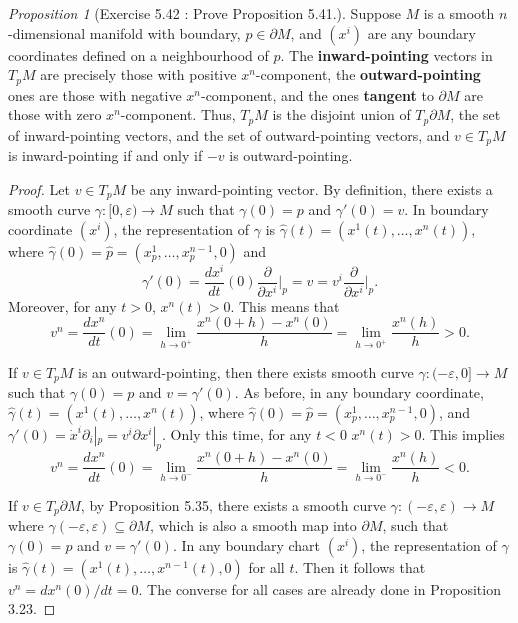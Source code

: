 \documentclass[a4paper]{article}
\theoremstyle{remark}
\newtheorem{prop}{Proposition}
\newcommand{\doo}{\partial}    %
\newcommand{\subhim}{\subseteq} %
\begin{document}
\begin{prop}[Exercise 5.42  : Prove Proposition 5.41.]
Suppose $M$ is a smooth $n$-dimensional manifold with boundary, $p \in \doo M$, and $(x^i)$ are any boundary coordinates defined on a neighbourhood of $p$. The \textbf{inward-pointing} vectors in $T_pM$ are precisely those with positive $x^n$-component, the \textbf{outward-pointing} ones are those with negative $x^n$-component, and the ones \textbf{tangent} to $\doo M$ are those with zero $x^n$-component. Thus, $T_pM$ is the disjoint union of $T_p\doo M$, the set of inward-pointing vectors, and the set of outward-pointing vectors, and $v \in T_pM$ is inward-pointing if and only if $-v$ is outward-pointing.
\end{prop}
\begin{proof}
Let $v \in T_pM$ be any inward-pointing vector. By definition, there exists a smooth curve $\gamma :[0,\varepsilon) \to M$ such that $\gamma(0)=p$ and $\gamma'(0) = v$. In boundary coordinate $(x^i)$, the representation of $\gamma$ is $\widehat{\gamma}(t) = (x^1(t),\dots,x^n(t))$, where $\widehat{\gamma}(0) = \widehat{p} = (x^1_p,\dots,x^{n-1}_p,0)$ and 
$$
\gamma'(0) = \frac{dx^i}{dt}(0) \frac{\doo}{\doo x^i}\bigg|_p=v = v^i\frac{\doo}{\doo x^i}\bigg|_p.
$$ 
Moreover, for any $t>0$, $x^n(t) > 0$. This means that
$$
v^n = \frac{dx^n}{dt}(0) = \lim_{h \to 0^+} \frac{x^n(0+h) - x^n(0)}{h} = \lim_{h\to 0^+} \frac{x^n(h)}{h} > 0 .
$$

If $v \in T_pM$ is an outward-pointing, then there exists smooth curve $\gamma : (-\varepsilon,0] \to M$ such that $\gamma(0) = p$ and $v = \gamma'(0)$. As before, in any boundary coordinate, $\widehat{\gamma}(t) = (x^1(t),\dots,x^n(t))$, where $\widehat{\gamma}(0) = \widehat{p} = (x^1_p,\dots,x^{n-1}_p,0)$, and $\gamma'(0) = \dot{x}^i \doo_i|_p = v^i \doo x^i|_p$. Only this time, for any $t<0$ $x^n(t)>0$. This implies
$$
v^n = \frac{dx^n}{dt}(0) = \lim_{h \to 0^-} \frac{x^n(0+h) - x^n(0)}{h} = \lim_{h \to 0^-} \frac{x^n(h)}{h} < 0.
$$

If $v \in T_p\doo M$, by Proposition 5.35, there exists a smooth curve $\gamma : (-\varepsilon,\varepsilon) \to M$ where $\gamma(-\varepsilon,\varepsilon) \subhim \doo M$, which is also a smooth map into $\doo M$, such that $\gamma(0) = p$ and $v = \gamma'(0)$. In any boundary chart $(x^i)$, the representation of $\gamma$ is $\widehat{\gamma}(t) = (x^1(t),\dots,x^{n-1}(t),0)$ for all $t$. Then it follows that $v^n =dx^n(0)/dt = 0$. The converse for all cases are already done in Proposition 3.23.
\end{proof}
\end{document}
